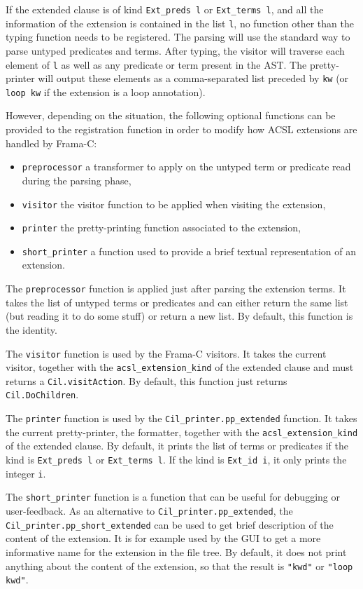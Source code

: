 If the extended clause is of kind \verb|Ext_preds l| or \verb|Ext_terms l|,
and all the information of the extension is contained in the list \verb|l|,
no function other than the typing function needs to be registered. The parsing
will use the standard way to parse untyped predicates and terms. After
typing, the visitor will traverse each element of \verb|l| as well as any
predicate or term present in the AST. The pretty-printer will output these
elements as a comma-separated list preceded by \verb|kw| (or \verb|loop kw| if
the extension is a loop annotation).

However, depending on the situation, the following optional functions can be
provided to the registration function in order to modify how ACSL extensions
are handled by Frama-C:

\begin{itemize}
\item \texttt{preprocessor} a transformer to apply on the untyped term or
  predicate read during the parsing phase,
\item \texttt{visitor} the visitor function to be applied when visiting
  the extension,
\item \texttt{printer} the pretty-printing function associated to the
  extension,
\item \texttt{short\_printer} a function used to provide a brief textual
  representation of an extension.
\end{itemize}

The \verb|preprocessor| function is applied just after parsing the extension
terms. It takes the list of untyped terms or predicates and can either return
the same list (but reading it to do some stuff) or return a new list. By
default, this function is the identity.

The \verb|visitor| function is used by the Frama-C visitors. It takes the
current visitor, together with the \verb|acsl_extension_kind| of the extended
clause and must returns a \verb|Cil.visitAction|. By default, this function
just returns \verb|Cil.DoChildren|.

The \verb|printer| function is used by the \verb|Cil_printer.pp_extended|
function. It takes the current pretty-printer, the formatter, together with
the \verb|acsl_extension_kind| of the extended clause. By default, it prints
the list of terms or predicates if the kind is \verb|Ext_preds l| or
\verb|Ext_terms l|. If the kind is \verb|Ext_id i|, it only prints the
integer \verb|i|.

The \verb|short_printer| function is a function that can be useful for
debugging or user-feedback. As an alternative to \verb|Cil_printer.pp_extended|,
the \verb|Cil_printer.pp_short_extended| can be used to get brief description
of the content of the extension. It is for example used by the GUI to get
a more informative name for the extension in the file tree. By default, it
does not print anything about the content of the extension, so that the
result is \verb|"kwd"| or \verb|"loop kwd"|.

